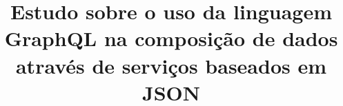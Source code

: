 \documentclass{ufsctex/ufsctex}
\title{Estudo sobre o uso da linguagem GraphQL na composição de dados através de serviços baseados em JSON}
\begin{document}

\sumario



\apendice
\anexo

\end{document}
